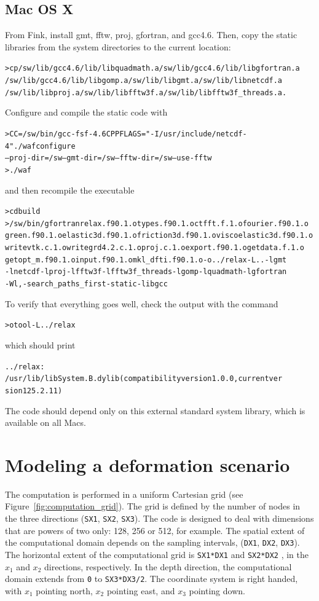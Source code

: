 \documentclass[10pt]{article}
\begin{document}
\subsection{Mac OS X}
From Fink, install gmt, fftw, proj, gfortran, and gcc4.6. Then, copy the static libraries from the system directories to the current location:
\begin{alltt}
{\color{orange}> cp /sw/lib/gcc4.6/lib/libquadmath.a /sw/lib/gcc4.6/lib/libgfortran.a 
/sw/lib/gcc4.6/lib/libgomp.a /sw/lib/libgmt.a /sw/lib/libnetcdf.a 
/sw/lib/libproj.a /sw/lib/libfftw3f.a /sw/lib/libfftw3f_threads.a .}
\end{alltt}
Configure and compile the static code with
\begin{alltt}
{\color{orange}> CC=/sw/bin/gcc-fsf-4.6 CPPFLAGS="-I/usr/include/netcdf-4" ./waf configure 
--proj-dir=/sw --gmt-dir=/sw --fftw-dir=/sw --use-fftw
> ./waf}
\end{alltt}
and then recompile the executable
\begin{alltt}
{\color{orange}> cd build
> /sw/bin/gfortran relax.f90.1.o types.f90.1.o ctfft.f.1.o fourier.f90.1.o 
green.f90.1.o elastic3d.f90.1.o friction3d.f90.1.o viscoelastic3d.f90.1.o 
writevtk.c.1.o writegrd4.2.c.1.o proj.c.1.o export.f90.1.o getdata.f.1.o 
getopt_m.f90.1.o input.f90.1.o mkl_dfti.f90.1.o -o ../relax -L.. -lgmt 
-lnetcdf -lproj -lfftw3f -lfftw3f_threads -lgomp -lquadmath -lgfortran 
-Wl,-search_paths_first -static-libgcc}
\end{alltt}
To verify that everything goes well, check the output with the command 
\begin{alltt}
{\color{orange}> otool -L ../relax}
\end{alltt}
which should print
\begin{alltt}
{\color{NavyBlue}../relax:
        /usr/lib/libSystem.B.dylib (compatibility version 1.0.0, current ver
sion 125.2.11)}
\end{alltt}
The code should depend only on this external standard system library, which is available on all Macs.


\section{Modeling a deformation scenario}

The computation is performed in a uniform Cartesian grid (see Figure~\ref{fig:computation_grid}). The grid is defined by the number of nodes in the three directions (\verb'SX1', \verb'SX2', \verb'SX3'). The code is designed to deal with dimensions that are powers of two only: 128, 256 or 512, for example. The spatial extent of the computational domain depends on the sampling intervals, (\verb'DX1', \verb'DX2', \verb'DX3'). The horizontal extent of the computational grid is \verb'SX1*DX1' and \verb'SX2*DX2' , in the $x_1$ and $x_2$ directions, respectively. In the depth direction, the computational domain extends from \verb'0' to \verb'SX3*DX3/2'. The coordinate system is right handed, with $x_1$ pointing north, $x_2$ pointing east, and $x_3$ pointing down. 
\end{document}
